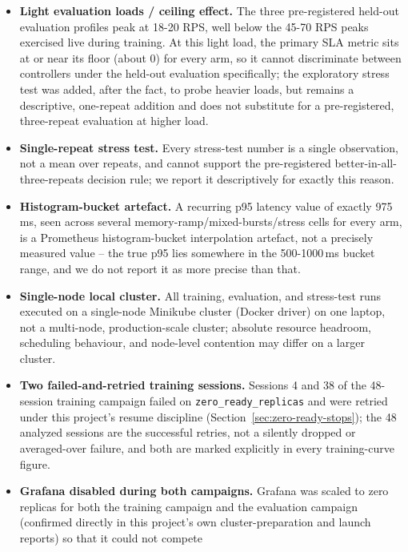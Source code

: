 \begin{itemize}[nosep]
  \item \textbf{Light evaluation loads / ceiling effect.} The three
    pre-registered held-out evaluation profiles peak at 18-20 RPS, well
    below the 45-70 RPS peaks exercised live during training. At this
    light load, the primary SLA metric sits at or near its floor (about
    0) for every arm, so it cannot discriminate between controllers under
    the held-out evaluation specifically; the exploratory stress test was
    added, after the fact, to probe heavier loads, but remains a
    descriptive, one-repeat addition and does not substitute for a
    pre-registered, three-repeat evaluation at higher load.
  \item \textbf{Single-repeat stress test.} Every stress-test number is a
    single observation, not a mean over repeats, and cannot support the
    pre-registered better-in-all-three-repeats decision rule; we report it
    descriptively for exactly this reason.
  \item \textbf{Histogram-bucket artefact.} A recurring p95 latency value
    of exactly 975\,ms, seen across several memory-ramp/mixed-bursts/stress
    cells for every arm, is a Prometheus histogram-bucket interpolation
    artefact, not a precisely measured value -- the true p95 lies somewhere
    in the 500-1000\,ms bucket range, and we do not report it as more
    precise than that.
  \item \textbf{Single-node local cluster.} All training, evaluation, and
    stress-test runs executed on a single-node Minikube cluster (Docker
    driver) on one laptop, not a multi-node, production-scale cluster;
    absolute resource headroom, scheduling behaviour, and node-level
    contention may differ on a larger cluster.
  \item \textbf{Two failed-and-retried training sessions.} Sessions 4 and
    38 of the 48-session training campaign failed on
    \texttt{zero\_\allowbreak ready\_\allowbreak replicas} and were retried under this project's
    resume discipline (Section~\ref{sec:zero-ready-stops}); the 48
    analyzed sessions are the successful retries, not a silently dropped
    or averaged-over failure, and both are marked explicitly in every
    training-curve figure.
  \item \textbf{Grafana disabled during both campaigns.} Grafana was
    scaled to zero replicas for both the training campaign and the
    evaluation campaign (confirmed directly in this project's own
    cluster-preparation and launch reports) so that it could not compete

\end{itemize}
